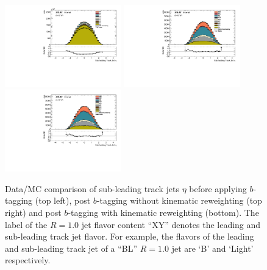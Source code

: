 \begin{figure}[htbp]
  \centering
 \includegraphics[width=0.45\textwidth]{figures/gbb/SubLeadTrkJet_eta_NoReweight.pdf}
 \includegraphics[width=0.45\textwidth]{figures/gbb/SubLeadTrkJet_eta_PreReweight.pdf}\\
 \includegraphics[width=0.45\textwidth]{figures/gbb/SubLeadTrkJet_eta_Reweight.pdf}
\caption{Data/MC comparison of sub-leading track jets $\eta$ before applying $b$-tagging (top left), post $b$-tagging without kinematic reweighting (top right) and post $b$-tagging with kinematic reweighting (bottom). The label of the $R=1.0$ jet flavor content ``XY'' denotes the leading and sub-leading track jet flavor. For example, the flavors of the leading and sub-leading track jet of a ``BL'' $R=1.0$ jet are `B' and `Light' respectively.}
  \label{fig:gbb-eta_subtrkjets}
\end{figure}


